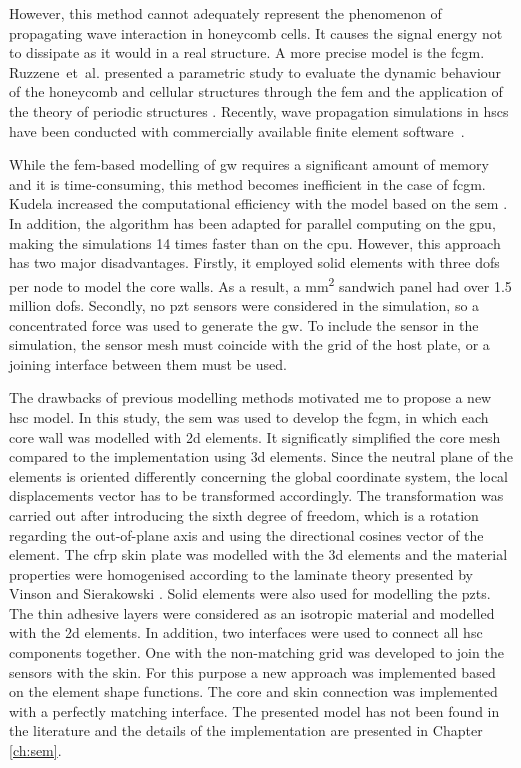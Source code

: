 \documentclass[11pt,a4paper,final]{report}
\theoremstyle{plain}
\begin{document}
However, this method cannot adequately represent the phenomenon of propagating wave interaction in honeycomb cells.
It causes the signal energy not to dissipate as it would in a real structure.
A more precise model is the \ac{fcgm}. 
Ruzzene~et~al. presented a parametric study to evaluate the dynamic behaviour of the honeycomb and cellular structures through the \ac{fem} and the application of the theory of periodic structures \cite{ruzzene2003wave}.
Recently, wave propagation simulations in \acp{hsc} have been conducted with commercially available finite element software~\cite{song2009guided, hosseini2013numerical, tian2015wavenumber, zhao2018wave}.

While the \ac{fem}-based modelling of \ac{gw} requires a significant amount of memory and it is time-consuming, this method becomes inefficient in the case of \ac{fcgm}.
Kudela increased the computational efficiency with the model based on the \ac{sem} \cite{kudela2016parallel}.
In addition, the algorithm has been adapted for parallel computing on the \ac{gpu}, making the simulations 14 times faster than on the \ac{cpu}.
However, this approach has two major disadvantages. Firstly, it employed solid elements with three \acp{dof} per node to model the core walls. As a result, a  \unit{\square\mm} sandwich panel had over 1.5 million \acp{dof}.
Secondly, no \ac{pzt} sensors were considered in the simulation, so a concentrated force was used to generate the \ac{gw}.
To include the sensor in the simulation, the sensor mesh must coincide with the grid of the host plate, or a joining interface between them must be used.

The drawbacks of previous modelling methods motivated me to propose a new \ac{hsc} model.
In this study, the \ac{sem} was used to develop the \ac{fcgm}, in which each core wall was modelled with \ac{2d} elements.
It significatly simplified the core mesh compared to the implementation using \ac{3d} elements.
Since the neutral plane of the elements is oriented differently concerning the global coordinate system, the local displacements vector has to be transformed accordingly.
The transformation was carried out after introducing the sixth degree of freedom, which is a rotation regarding the out-of-plane axis and using the directional cosines vector of the element.
The \ac{cfrp} skin plate was modelled with the \ac{3d} elements and the material properties were homogenised according to the laminate theory presented by Vinson and Sierakowski \cite{vinson1993behavior}.
Solid elements were also used for modelling the \acp{pzt}.
The thin adhesive layers were considered as an isotropic material and modelled with the \ac{2d} elements.
In addition, two interfaces were used to connect all \ac{hsc} components together.
One with the non-matching grid was developed to join the sensors with the skin.
For this purpose a new approach was implemented based on the element shape functions.
The core and skin connection was implemented with a perfectly matching interface.
The presented model has not been found in the literature and the details of the implementation are presented in Chapter \ref{ch:sem}.
\end{document}
